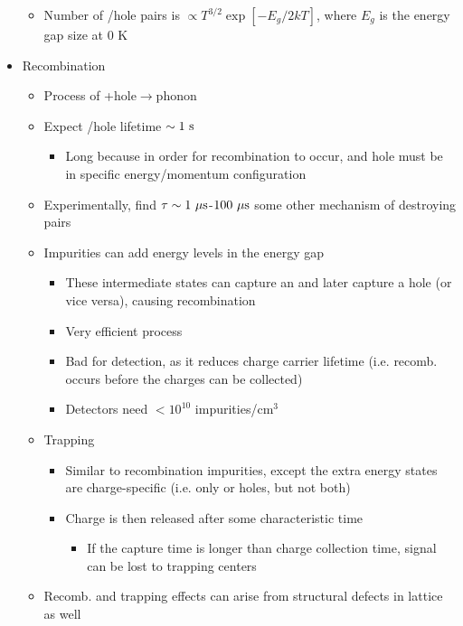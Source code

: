 \begin{itemize}
\begin{itemize}
\begin{itemize}
    \end{itemize}
    \item Number of \el/hole pairs is $\propto T^{3/2}\exp \left[-E_g/2kT\right] $, where $E_g$ is the energy gap size at 0 K
  \end{itemize}
  \item Recombination
  \begin{itemize}
    \item Process of \el+hole$\rightarrow$phonon
    \item Expect \el/hole lifetime $\sim1~\text{s}$
    \begin{itemize}
      \item Long because in order for recombination to occur, \el and hole must be in specific energy/momentum configuration
    \end{itemize}
    \item Experimentally, find $\tau\sim 1~\mu\text{s}$-$100~\mu\text{s}$ \thus some other mechanism of destroying pairs
    \item Impurities can add energy levels in the energy gap
    \begin{itemize}
      \item These intermediate states can capture an \el and later capture a hole (or vice versa), causing recombination
      \item Very efficient process
      \item Bad for detection, as it reduces charge carrier lifetime (i.e. recomb. occurs before the charges can be collected)
      \item Detectors need $<10^{10}$ impurities/cm$^3$
    \end{itemize}
    \item Trapping
    \begin{itemize}
      \item Similar to recombination impurities, except the extra energy states are charge-specific (i.e. only \el or holes, but not both)
      \item Charge is then released after some characteristic time
      \begin{itemize}
        \item If the capture time is longer than charge collection time, signal can be lost to trapping centers
      \end{itemize}
    \end{itemize}
    \item Recomb. and trapping effects can arise from structural defects in lattice as well
  \end{itemize}
\end{itemize}


